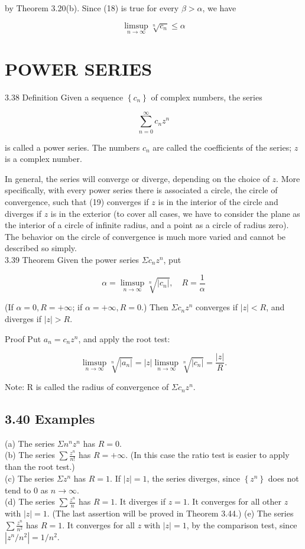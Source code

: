 \documentclass[10pt]{article}
\begin{document}
by Theorem 3.20(b). Since (18) is true for every $\beta>\alpha$, we have

$$
\limsup _{n \rightarrow \infty} \sqrt[n]{c_{n}} \leq \alpha
$$

\section*{POWER SERIES}
3.38 Definition Given a sequence $\left\{c_{n}\right\}$ of complex numbers, the series


\begin{equation*}
\sum_{n=0}^{\infty} c_{n} z^{n} \tag{19}
\end{equation*}


is called a power series. The numbers $c_{n}$ are called the coefficients of the series; $z$ is a complex number.

In general, the series will converge or diverge, depending on the choice of $z$. More specifically, with every power series there is associated a circle, the circle of convergence, such that (19) converges if $z$ is in the interior of the circle and diverges if $z$ is in the exterior (to cover all cases, we have to consider the plane as the interior of a circle of infinite radius, and a point as a circle of radius zero). The behavior on the circle of convergence is much more varied and cannot be described so simply.\\
3.39 Theorem Given the power series $\Sigma c_{n} z^{n}$, put

$$
\alpha=\limsup _{n \rightarrow \infty} \sqrt[n]{\left|c_{n}\right|}, \quad R=\frac{1}{\alpha}
$$

(If $\alpha=0, R=+\infty$; if $\alpha=+\infty, R=0$.) Then $\Sigma c_{n} z^{n}$ converges if $|z|<R$, and diverges if $|z|>R$.

Proof Put $a_{n}=c_{n} z^{n}$, and apply the root test:

$$
\limsup _{n \rightarrow \infty} \sqrt[n]{\left|a_{n}\right|}=|z| \limsup _{n \rightarrow \infty} \sqrt[n]{\left|c_{n}\right|}=\frac{|z|}{R} .
$$

Note: R is called the radius of convergence of $\Sigma c_{n} z^{n}$.

\subsection*{3.40 Examples}
(a) The series $\Sigma n^{n} z^{n}$ has $R=0$.\\
(b) The series $\sum \frac{z^{n}}{n!}$ has $R=+\infty$. (In this case the ratio test is easier to apply than the root test.)\\
(c) The series $\Sigma z^{n}$ has $R=1$. If $|z|=1$, the series diverges, since $\left\{z^{n}\right\}$ does not tend to 0 as $n \rightarrow \infty$.\\
(d) The series $\sum \frac{z^{n}}{n}$ has $R=1$. It diverges if $z=1$. It converges for all other $z$ with $|z|=1$. (The last assertion will be proved in Theorem 3.44.) (e) The series $\sum \frac{z^{n}}{n^{2}}$ has $R=1$. It converges for all $z$ with $|z|=1$, by the comparison test, since $\left|z^{n} / n^{2}\right|=1 / n^{2}$.
\end{document}
